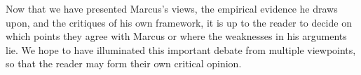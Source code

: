 \documentclass[../../main.tex]{subfiles}
\begin{document}
Now that we have presented Marcus's views, the empirical evidence he draws upon, and the critiques of his own framework, it is up to the reader to decide on which points they agree with Marcus or where the weaknesses in his arguments lie. We hope to have illuminated this important debate from multiple viewpoints, so that the reader may form their own critical opinion.
\end{document}
